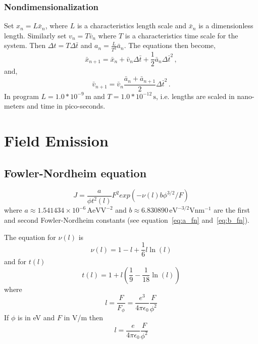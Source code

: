 \documentclass[a4paper,10pt]{article}
\begin{document}
\subsubsection{Nondimensionalization}
  Set \(x_n = L \bar{x}_n\), where \(L\) is a characteristics length scale and
  \(\bar{x}_n\) is a dimensionless length. Similarly set \(v_n = T \bar{v}_n\)
  where \(T\) is a characteristics time scale for the system.
  Then \(\Delta t = T\Delta \bar{t}\) and \(a_n = \frac{L}{T^2}\bar{a}_n\).
  The equations then become,
  \begin{equation}
    \bar{x}_{n+1} = \bar{x}_n + \bar{v}_n\Delta \bar{t} + \frac{1}{2}\bar{a}_n{\Delta \bar{t}}^2\, ,
  \end{equation}
  and,
  \begin{equation}
    \bar{v}_{n+1} = \bar{v}_n \frac{\bar{a}_n + \bar{a}_{n+1}}{2}{\Delta \bar{t}}^2\, .
  \end{equation}
  In program \(L = 1.0*10^{-9}\,\mathrm{m}\) and \(T = 1.0*10^{-12}\,\mathrm{s}\),
  i.e. lengths are scaled in nano-meters and time in pico-seconds.

\section{Field Emission}
\subsection{Fowler-Nordheim equation}
\begin{equation}
  J = \frac{a}{\phi t^2(l)}F^2 exp(-\nu(l)b\phi^{3/2}/F)
\end{equation}
where \(a \approx 1.541434\times 10^{-6}\,\mathrm{AeVV^{-2}}\) and \(b \approx 6.830890\,\mathrm{eV^{-3/2} V nm^{-1}}\) are
the first and second Fowler-Nordheim constants (see equation~\eqref{eq:a_fn} and~\eqref{eq:b_fn}).

The equation for \(\nu(l)\) is~\cite{Forbes08112007}
\begin{equation}
 \nu(l) = 1 - l + \frac{1}{6}l \ln(l)
\end{equation}
and for \(t(l)\)
\begin{equation}
  t(l) = 1 + l\left( \frac{1}{9} - \frac{1}{18}\ln(l) \right)
\end{equation}
where
\begin{equation}
 l = \frac{F}{F_\phi} = \frac{e^3}{4\pi\epsilon_0} \frac{F}{\phi^2}
\end{equation}
If \(\phi\) is in eV and \(F\) in V/m then
\begin{equation}
  l = \frac{e}{4\pi\epsilon_0} \frac{F}{\phi^2}
\end{equation}
\end{document}
